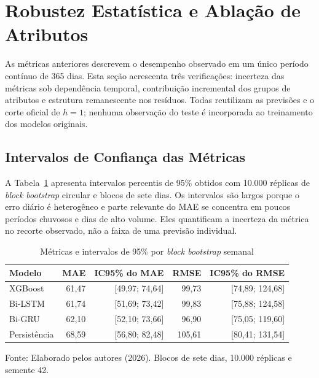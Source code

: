 \section{Robustez Estatística e Ablação de Atributos}\label{sec:robustez_resultados}

As métricas anteriores descrevem o desempenho observado em um único período contínuo de 365 dias. Esta seção acrescenta três verificações: incerteza das métricas sob dependência temporal, contribuição incremental dos grupos de atributos e estrutura remanescente nos resíduos. Todas reutilizam as previsões e o corte oficial de $h=1$; nenhuma observação do teste é incorporada ao treinamento dos modelos originais.

\subsection{Intervalos de Confiança das Métricas}\label{sec:resultados_bootstrap}

A Tabela~\ref{tab:intervalos_bootstrap} apresenta intervalos percentis de 95\% obtidos com 10.000 réplicas de \textit{block bootstrap} circular e blocos de sete dias. Os intervalos são largos porque o erro diário é heterogêneo e parte relevante do MAE se concentra em poucos períodos chuvosos e dias de alto volume. Eles quantificam a incerteza da métrica no recorte observado, não a faixa de uma previsão individual.

\begin{table}[H]
\centering
\caption{Métricas e intervalos de 95\% por \textit{block bootstrap} semanal}
\label{tab:intervalos_bootstrap}
\small
\begin{tabular}{lrrrr}
\toprule
\textbf{Modelo} & \textbf{MAE} & \textbf{IC95\% do MAE} & \textbf{RMSE} & \textbf{IC95\% do RMSE} \\
\midrule
XGBoost & 61,47 & [49,97; 74,64] & 99,73 & [74,89; 124,68] \\
Bi-LSTM & 61,74 & [51,69; 73,42] & 99,83 & [75,88; 124,58] \\
Bi-GRU & 62,10 & [52,10; 73,66] & 96,90 & [75,05; 119,60] \\
Persistência & 68,59 & [56,80; 82,48] & 105,61 & [80,41; 131,54] \\
\bottomrule
\end{tabular}
\par\smallskip
{\small Fonte: Elaborado pelos autores (2026). Blocos de sete dias, 10.000 réplicas e semente 42.\par}
\end{table}

